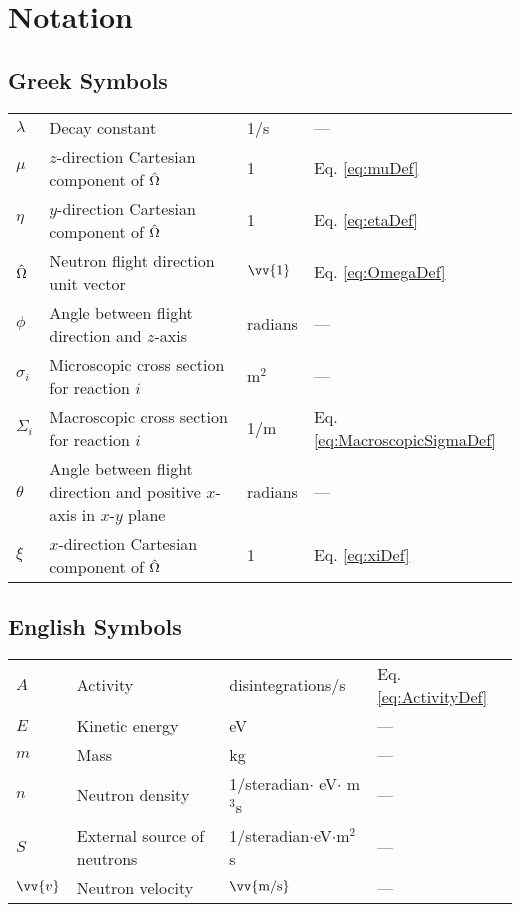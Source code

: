 \section{Notation}

\subsection{Greek Symbols}

\begin{tabular}{l l l l}
\(\lambda\) & Decay constant & 1/s & ---\\
\(\mu\) & \(z\)-direction Cartesian component of \(\hat{\Omega}\) & 1 & Eq. \eqref{eq:muDef}\\
\(\eta\) & \(y\)-direction Cartesian component of \(\hat{\Omega}\) & 1 & Eq. \eqref{eq:etaDef}\\
\(\hat{\Omega}\) & Neutron flight direction unit vector & \(\vv{1}\) & Eq. \eqref{eq:OmegaDef}\\
\(\phi\) & Angle between flight direction and \(z\)-axis & radians & ---\\
\(\sigma_i\) & Microscopic cross section for reaction \(i\) & m$^2$ & ---\\
\(\Sigma_i\) & Macroscopic cross section for reaction \(i\) & 1/m & Eq. \eqref{eq:MacroscopicSigmaDef}\\
\(\theta\) & Angle between flight direction and positive \(x\)-axis in \(x\)-\(y\) plane & radians & ---\\
\(\xi\) & \(x\)-direction Cartesian component of \(\hat{\Omega}\) & 1 & Eq. \eqref{eq:xiDef}\\
\end{tabular}

\subsection{English Symbols}

\begin{tabular}{l l l l}
\(A\) & Activity & disintegrations/s & Eq. \eqref{eq:ActivityDef}\\
\(E\) & Kinetic energy & eV & ---\\
\(m\) & Mass & kg & ---\\
\(n\) & Neutron density & 1/steradian\(\cdot\) eV\(\cdot\) m$^3$s & ---\\
\(S\) & External source of neutrons & 1/steradian\(\cdot\)eV\(\cdot\)m$^2$s & ---\\
\(\vv{v}\) & Neutron velocity & \(\vv{\text{m/s}}\) & ---\\
\end{tabular}

